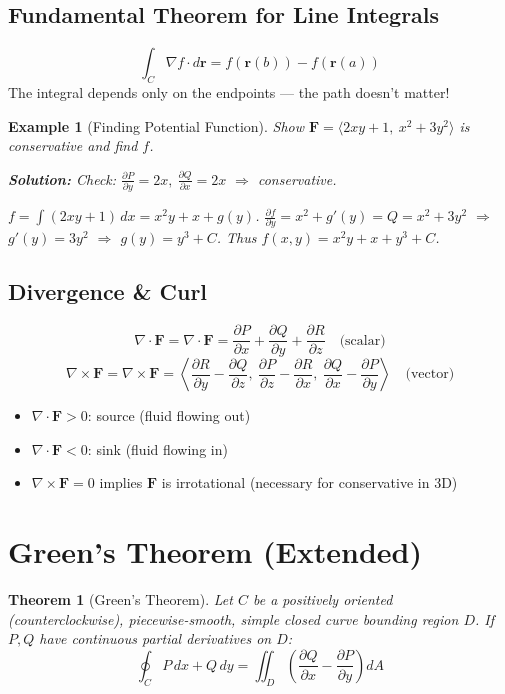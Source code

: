 \documentclass[12pt]{article}
\newcommand{\grad}{\nabla}
\newcommand{\curl}{\nabla\times}
\newcommand{\divg}{\nabla\cdot}
\newtheorem{theorem}{Theorem}
\newtheorem{example}{Example}[section]
\begin{document}
\subsection{Fundamental Theorem for Line Integrals}
\[
\boxed{\int_C \grad f\cdot d\mathbf{r} = f(\mathbf{r}(b)) - f(\mathbf{r}(a))}
\]
The integral depends only on the endpoints — the path doesn't matter!

\begin{example}[Finding Potential Function]
Show \(\mathbf{F} = \langle 2xy+1,\ x^2+3y^2\rangle\) is conservative and find \(f\).

\textbf{Solution:}
Check: \(\frac{\partial P}{\partial y}=2x,\ \frac{\partial Q}{\partial x}=2x\) \(\Rightarrow\) conservative.

\(f = \int (2xy+1)\,dx = x^2y + x + g(y)\).  
\(\frac{\partial f}{\partial y}=x^2+g'(y)=Q=x^2+3y^2\) \(\Rightarrow\) \(g'(y)=3y^2\) \(\Rightarrow\) \(g(y)=y^3+C\).  
Thus \(f(x,y)=x^2y + x + y^3 + C\).
\end{example}

\subsection{Divergence \& Curl}
\[
\divg \mathbf{F} = \grad\cdot\mathbf{F} = \frac{\partial P}{\partial x}+\frac{\partial Q}{\partial y}+\frac{\partial R}{\partial z}\quad\text{(scalar)}
\]
\[
\curl \mathbf{F} = \grad\times\mathbf{F} = \left\langle \frac{\partial R}{\partial y}-\frac{\partial Q}{\partial z},\ \frac{\partial P}{\partial z}-\frac{\partial R}{\partial x},\ \frac{\partial Q}{\partial x}-\frac{\partial P}{\partial y}\right\rangle \quad\text{(vector)}
\]
\begin{itemize}
    \item \(\divg\mathbf{F}>0\): source (fluid flowing out)
    \item \(\divg\mathbf{F}<0\): sink (fluid flowing in)
    \item \(\curl\mathbf{F}=0\) implies \(\mathbf{F}\) is irrotational (necessary for conservative in 3D)
\end{itemize}

\section{Green's Theorem (Extended)}

\begin{theorem}[Green's Theorem]
Let \(C\) be a positively oriented (counterclockwise), piecewise-smooth, simple closed curve bounding region \(D\). If \(P,Q\) have continuous partial derivatives on \(D\):
\[
\boxed{\oint_C P\,dx + Q\,dy = \iint_D \left(\frac{\partial Q}{\partial x} - \frac{\partial P}{\partial y}\right)dA}
\]
\end{theorem}
\end{document}
